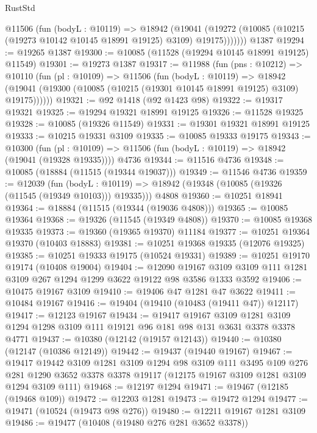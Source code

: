 \begin{lexlean}{RustStd}
\begin{coremodule}
        @11506
          (fun (bodyL : @10119) =>
          @18942
            (@19041
              (@19272 (@10085 (@10215 (@19273 @10142 @10145 @18991 @19125) @3109) @19175)))))))
    @1387
@19294 := @19265 @1387
@19300 := @10085 (@11528 (@19294 @10145 @18991 @19125) @11549)
@19301 := @19273 @1387
@19317 := @11988
    (fun (pns : @10212) =>
    @10110
      (fun (pl : @10109) =>
      @11506
        (fun (bodyL : @10119) =>
        @18942 (@19041 (@19300 (@10085 (@10215 (@19301 @10145 @18991 @19125) @3109) @19175))))))
@19321 := @92 @1418 (@92 @1423 @98)
@19322 := @19317 @19321
@19325 := @19294 @19321 @18991 @19125
@19326 := @11528 @19325
@19328 := @10085 (@19326 @11549)
@19331 := @19301 @19321 @18991 @19125
@19333 := @10215 @19331 @3109
@19335 := @10085 @19333 @19175
@19343 := @10300
    (fun (pl : @10109) => @11506 (fun (bodyL : @10119) => @18942 (@19041 (@19328 @19335))))
    @4736
@19344 := @11516 @4736
@19348 := @10085 (@18884 (@11515 (@19344 @19037)))
@19349 := @11546 @4736
@19359 := @12039
    (fun (bodyL : @10119) => @18942 (@19348 (@10085 (@19326 (@11545 (@19349 @10103))) @19335)))
    @4808
@19360 := @10251 @18941
@19364 := @18884 (@11515 (@19344 (@19036 @4808)))
@19365 := @10085 @19364
@19368 := @19326 (@11545 (@19349 @4808))
@19370 := @10085 @19368 @19335
@19373 := @19360 (@19365 @19370) @11184
@19377 := @10251 @19364 @19370 (@10403 @18883)
@19381 := @10251 @19368 @19335 (@12076 @19325)
@19385 := @10251 @19333 @19175 (@10524 @19331)
@19389 := @10251 @19170 @19174 (@10408 @19004)
@19404 := @12090
    @19167
    @3109
    @3109
    @111
    @1281
    @3109
    @267
    @1294
    @1299
    @3622
    @19122
    @98
    @3586
    @1333
    @3592
@19406 := @10475 @19167 @3109
@19410 := @19406 @47 @1281 @47 @3622
@19411 := @10484 @19167
@19416 := @19404 (@19410 (@10483 (@19411 @47)) @12117)
@19417 := @12123 @19167
@19434 := @19417
    @19167
    @3109
    @1281
    @3109
    @1294
    @1298
    @3109
    @111
    @19121
    @96
    @181
    @98
    @131
    @3631
    @3378
    @3378
    @4771
@19437 := @10380 (@12142 (@19157 @12143))
@19440 := @10380 (@12147 (@10386 @12149))
@19442 := @19437 (@19440 @19167)
@19467 := @19417
    @19442
    @3109
    @1281
    @3109
    @1294
    @98
    @3109
    @111
    @3495
    @109
    @276
    @281
    @1290
    @3652
    @3378
    @3378
    @19117
    (@12175 @19167 @3109 @1281 @3109 @1294 @3109 @111)
@19468 := @12197 @1294
@19471 := @19467 (@12185 (@19468 @109))
@19472 := @12203 @1281
@19473 := @19472 @1294
@19477 := @19471 (@10524 (@19473 @98 @276))
@19480 := @12211 @19167 @1281 @3109
@19486 := @19477 (@10408 (@19480 @276 @281 @3652 @3378))

\end{coremodule}
\end{lexlean}
